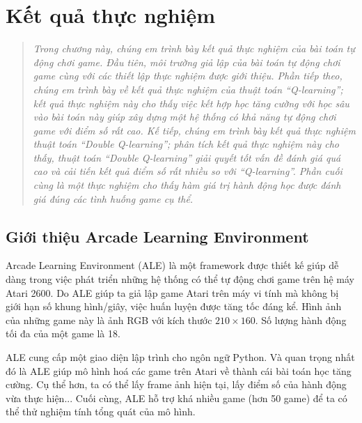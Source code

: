 \chapter{Kết quả thực nghiệm}
\ifpdf
\graphicspath{{Chapter4/Chapter4Figs/PNG/}{Chapter4/Chapter4Figs/PDF/}{Chapter4/Chapter4Figs/}}
\else
\graphicspath{{Chapter4/Chapter4Figs/EPS/}{Chapter4/Chapter4Figs/}}
\fi
\begin{quote}
	\textit{Trong chương này, chúng em trình bày kết quả thực nghiệm của bài toán tự động chơi game.
	Đầu tiên, môi trường giả lập của bài toán tự động chơi game cùng với các thiết lập thực nghiệm được giới thiệu.
	Phần tiếp theo, chúng em trình bày về kết quả thực nghiệm của thuật toán ``Q-learning''; kết quả thực nghiệm này cho thấy việc kết hợp học tăng cường với học sâu vào bài toán này giúp xây dựng một hệ thống có khả năng tự động chơi game với điểm số rất cao.
	Kế tiếp, chúng em trình bày kết quả thực nghiệm thuật toán ``Double Q-learning''; phân tích kết quả thực nghiệm này cho thấy, thuật toán ``Double Q-learning'' giải quyết tốt vấn đề đánh giá quá cao và cải tiến kết quả điểm số rất nhiều so với ``Q-learning''.
	Phần cuối cùng là một thực nghiệm cho thấy hàm giá trị hành động học được đánh giá đúng các tình huống game cụ thể.}
\end{quote}
 
\section{Giới thiệu Arcade Learning Environment}
Arcade Learning Environment (ALE) \cite{bellemare2012arcade} là một framework được thiết kế giúp dễ dàng trong việc phát triển những hệ thống có thể tự động chơi game trên hệ máy Atari 2600.
Do ALE giúp ta giả lập game Atari trên máy vi tính mà không bị giới hạn số khung hình/giây, việc huấn luyện được tăng tốc đáng kể.
Hình ảnh của những game này là ảnh RGB với kích thước $210 \times 160$. 
Số lượng hành động tối đa của một game là 18.

ALE cung cấp một giao diện lập trình cho ngôn ngữ Python.
Và quan trọng nhất đó là ALE giúp mô hình hoá các game trên Atari về thành cái bài toán học tăng cường.
Cụ thể hơn, ta có thể lấy frame ảnh hiện tại, lấy điểm số của hành động vừa thực hiện...
Cuối cùng, ALE hỗ trợ khá nhiều game (hơn 50 game) để ta có thể thử nghiệm tính tổng quát của mô hình.

